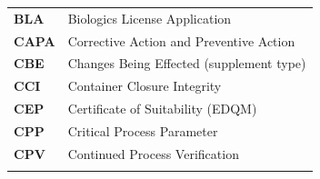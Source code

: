 \documentclass[
  11pt,
  a4paper,
]{report}
\begin{document}
\begin{longtable}[]{@{}ll@{}}
\begin{minipage}[t]{0.33\columnwidth}\raggedright
\textbf{BLA}\strut
\end{minipage} & \begin{minipage}[t]{0.61\columnwidth}\raggedright
Biologics License Application\strut
\end{minipage}\tabularnewline
\begin{minipage}[t]{0.33\columnwidth}\raggedright
\textbf{CAPA}\strut
\end{minipage} & \begin{minipage}[t]{0.61\columnwidth}\raggedright
Corrective Action and Preventive Action\strut
\end{minipage}\tabularnewline
\begin{minipage}[t]{0.33\columnwidth}\raggedright
\textbf{CBE}\strut
\end{minipage} & \begin{minipage}[t]{0.61\columnwidth}\raggedright
Changes Being Effected (supplement type)\strut
\end{minipage}\tabularnewline
\begin{minipage}[t]{0.33\columnwidth}\raggedright
\textbf{CCI}\strut
\end{minipage} & \begin{minipage}[t]{0.61\columnwidth}\raggedright
Container Closure Integrity\strut
\end{minipage}\tabularnewline
\begin{minipage}[t]{0.33\columnwidth}\raggedright
\textbf{CEP}\strut
\end{minipage} & \begin{minipage}[t]{0.61\columnwidth}\raggedright
Certificate of Suitability (EDQM)\strut
\end{minipage}\tabularnewline
\begin{minipage}[t]{0.33\columnwidth}\raggedright
\textbf{CPP}\strut
\end{minipage} & \begin{minipage}[t]{0.61\columnwidth}\raggedright
Critical Process Parameter\strut
\end{minipage}\tabularnewline
\begin{minipage}[t]{0.33\columnwidth}\raggedright
\textbf{CPV}\strut
\end{minipage} & \begin{minipage}[t]{0.61\columnwidth}\raggedright
Continued Process Verification\strut
\end{minipage}\tabularnewline
\begin{minipage}[t]{0.33\columnwidth}\raggedright

\end{minipage}
\end{longtable}
\end{document}
